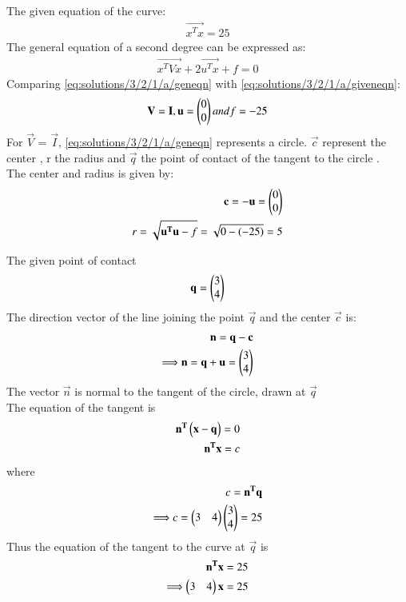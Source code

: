 The given equation of the curve:
\begin{align}
    \vec{x^Tx}=25\label{eq:solutions/3/2/1/a/giveneqn}
\end{align}
The general equation of a second degree can
be expressed as:
\begin{align}
    \vec{x^TVx}+2\vec{u^Tx}+f=0 \label{eq:solutions/3/2/1/a/geneqn}
\end{align}
Comparing \eqref{eq:solutions/3/2/1/a/geneqn} with \eqref{eq:solutions/3/2/1/a/giveneqn}:\\
\begin{align}
    \mathbf{V} =  \mathbf{I},\mathbf{u}=\begin{pmatrix}0\\0\end{pmatrix} and f=-25 
\end{align}
For $\vec{V}$ =  $\vec{I}$, \eqref{eq:solutions/3/2/1/a/geneqn} represents a circle. \quad$\vec{c}$ represent the center , r the radius  and $\vec{q}$ the point of contact of the tangent to the circle .\\
The center and radius is given by:
\begin{align}
\mathbf{c}=-\mathbf{u}=\begin{pmatrix}0\\0\end{pmatrix}\label{eq:solutions/3/2/1/a/ceneqn}\\
r=\sqrt{\mathbf{u^Tu}-f}=\sqrt{0-(-25)}=5
\end{align}

The given point of contact
\begin{align}
 \mathbf{q}=\begin{pmatrix}3\\4\end{pmatrix} \label{eq:solutions/3/2/1/a/coord}  
\end{align}
The direction vector of the line joining the point $\vec{q}$ and the center $\vec{c}$ is:
\begin{align}
 \mathbf{n}= \mathbf{q}-\mathbf{c}\\
  \Longrightarrow\mathbf{n}= \mathbf{q}+\mathbf{u}=\begin{pmatrix}3\\4\end{pmatrix}
\end{align}
The vector $\vec{n}$ is  normal to the tangent of the circle, drawn at $\vec{q}$\\
The equation of the tangent is
\begin{align}
 \mathbf{n^T}\begin{pmatrix}\mathbf{x}-\mathbf{q}\end{pmatrix}=0\\
 \mathbf{n^T}\mathbf{x}=c\\
 \end{align}
 where 
 \begin{align}
c=\mathbf{n^T}\mathbf{q}\\
  \Longrightarrow c=\begin{pmatrix}3\quad4\end{pmatrix}\begin{pmatrix}3 \\4\end{pmatrix}=25
 \end{align}
Thus the equation of the tangent to the curve at $\vec{q}$ is
\begin{align}
    \mathbf{n^T}\mathbf{x}=25\\
     \Longrightarrow \begin{pmatrix}3\quad4\end{pmatrix}\mathbf{x}=25
\end{align}

